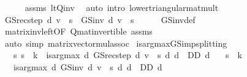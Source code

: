 \begin{isabellebody}
\ \ \ \ \isamarkupfalse%
\ assms\ lt{\isacharunderscore}{\kern0pt}Q{\isacharunderscore}{\kern0pt}inv\ \isamarkupfalse%
\ {\isacharparenleft}{\kern0pt}auto\ intro{\isacharcolon}{\kern0pt}\ lower{\isacharunderscore}{\kern0pt}triangular{\isacharunderscore}{\kern0pt}mat{\isacharunderscore}{\kern0pt}mult{\isacharparenright}{\kern0pt}\isanewline
\ \ \isamarkupfalse%
\ {\isachardoublequoteopen}GS{\isacharunderscore}{\kern0pt}rec{\isacharunderscore}{\kern0pt}step\ d\ v\ {\isachardollar}{\kern0pt}\ s\ {\isacharequal}{\kern0pt}\ GS{\isacharunderscore}{\kern0pt}inv\ d\ v\ {\isachardollar}{\kern0pt}\ s{\isachardoublequoteclose}\isanewline
\ \ \ \ \isamarkupfalse%
\ GS{\isacharunderscore}{\kern0pt}inv{\isacharunderscore}{\kern0pt}def\isanewline
\ \ \ \ \isamarkupfalse%
\ matrix{\isacharunderscore}{\kern0pt}inv{\isacharunderscore}{\kern0pt}left{\isacharbrackleft}{\kern0pt}OF\ Q{\isacharunderscore}{\kern0pt}mat{\isacharunderscore}{\kern0pt}invertible{\isacharbrackright}{\kern0pt}\ assms\ \ {\isacharasterisk}{\kern0pt}\isanewline
\ \ \ \ \isamarkupfalse%
\ {\isacharparenleft}{\kern0pt}auto\ simp{\isacharcolon}{\kern0pt}\ matrix{\isacharunderscore}{\kern0pt}vector{\isacharunderscore}{\kern0pt}mul{\isacharunderscore}{\kern0pt}assoc{\isacharparenright}{\kern0pt}\isanewline
{}\isamarkupfalse%
%
\endisatagproof
{\isafoldproof}%
%
\isadelimproof
\isanewline
%
\endisadelimproof
\isanewline
{}\isamarkupfalse%
\ is{\isacharunderscore}{\kern0pt}arg{\isacharunderscore}{\kern0pt}max{\isacharunderscore}{\kern0pt}GS{\isacharunderscore}{\kern0pt}imp{\isacharunderscore}{\kern0pt}splitting{\isacharprime}{\kern0pt}{\isacharcolon}{\kern0pt}\isanewline
\ \ \ {\isachardoublequoteopen}{\isasymAnd}s{\isachardot}{\kern0pt}\ s\ {\isasymle}\ k\ {\isasymLongrightarrow}\ is{\isacharunderscore}{\kern0pt}arg{\isacharunderscore}{\kern0pt}max\ {\isacharparenleft}{\kern0pt}{\isasymlambda}d{\isachardot}{\kern0pt}\ GS{\isacharunderscore}{\kern0pt}rec{\isacharunderscore}{\kern0pt}step\ d\ v\ {\isachardollar}{\kern0pt}\ s{\isacharparenright}{\kern0pt}\ {\isacharparenleft}{\kern0pt}{\isasymlambda}d{\isachardot}{\kern0pt}\ d\ {\isasymin}\ D\isactrlsub D{\isacharparenright}{\kern0pt}\ d{\isachardoublequoteclose}\isanewline
\ \ \ {\isachardoublequoteopen}s\ {\isasymle}\ k{\isachardoublequoteclose}\isanewline
\ \ \ {\isachardoublequoteopen}is{\isacharunderscore}{\kern0pt}arg{\isacharunderscore}{\kern0pt}max\ {\isacharparenleft}{\kern0pt}{\isasymlambda}d{\isachardot}{\kern0pt}\ GS{\isacharunderscore}{\kern0pt}inv\ d\ v\ {\isachardollar}{\kern0pt}\ s{\isacharparenright}{\kern0pt}\ {\isacharparenleft}{\kern0pt}{\isasymlambda}d{\isachardot}{\kern0pt}\ d\ {\isasymin}\ D\isactrlsub D{\isacharparenright}{\kern0pt}\ d{\isachardoublequoteclose}\isanewline

\end{isabellebody}
